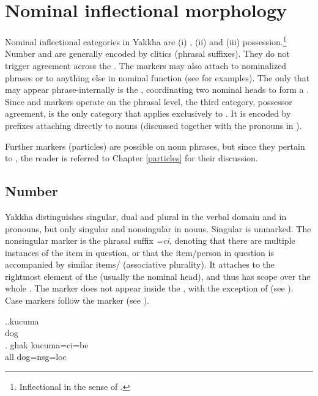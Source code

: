 \section{Nominal  inflectional morphology}\label{nom-morph}

Nominal inflectional categories in Yakkha are (i) , (ii)  and (iii) possession.\footnote{Inflectional in the sense of  \citep{Bickeletal2007Inflectional}.} Number and  are generally encoded by clitics (phrasal suffixes). They do not trigger agreement across the . The  markers may also attach to nominalized phrases or to anything else in nominal function (see  for examples). The only  that may appear phrase-internally is the  , coordinating two nominal heads to form a . Since  and  markers operate on the phrasal level, the third category, possessor agreement, is the only category that applies exclusively to . It is encoded by prefixes attaching directly to nouns (discussed together with the pronouns in ). 

Further markers (particles) are  possible on noun phrases, but since they pertain to , the reader is referred to Chapter \ref{particles} for their discussion.

\subsection{Number}\label{number}

Yakkha distinguishes singular, dual and plural in the verbal domain and in pronouns, but only singular and nonsingular in nouns. Singular  is unmarked. The nonsingular marker is the phrasal suffix \emph{=ci}, denoting that there are multiple instances of the item in question, or that the item/person in question is accompanied by similar items/ (associative plurality). It attaches to the rightmost element of the  (usually the nominal head), and thus has scope over the whole . The marker does not appear inside the , with the exception of  (see ). Case markers follow the  marker (see \Next). 

\ex.\ag.kucuma\\
dog\\
\bg. ghak kucuma=ci=be\\
all dog{\sc =nsg=loc}\\


